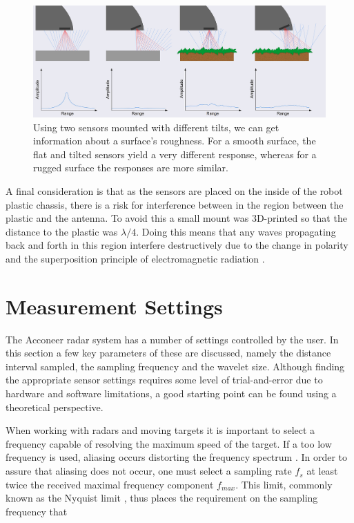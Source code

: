 \begin{figure}[h]
	\centering
	\includegraphics[scale=0.9]{figs_temp/reflections.jpg}
	\caption{Using two sensors mounted with different tilts, we can get information about a surface's roughness. For a smooth surface, the flat and tilted sensors yield a very different response, whereas for a rugged surface the responses are more similar.}
	\label{fig:reflections}
\end{figure}

A final consideration is that as the sensors are placed on the inside of the robot plastic chassis, there is a risk for interference between in the region between the plastic and the antenna. To avoid this a small mount was 3D-printed so that the distance to the plastic was $\lambda/4$. Doing this means that any waves propagating back and forth in this region interfere destructively due to the change in polarity and the superposition principle of electromagnetic radiation \citep{griffiths_2018}.

\section{Measurement Settings}

The Acconeer radar system has a number of settings controlled by the user. In this section a few key parameters of these are discussed, namely the distance interval sampled, the sampling frequency and the wavelet size. Although finding the appropriate sensor settings requires some level of trial-and-error due to hardware and software limitations, a good starting point can be found using a theoretical perspective. 


When working with radars and moving targets it is important to select a frequency capable of resolving the maximum speed of the target. If a too low frequency is used, aliasing occurs distorting the frequency spectrum \citep{lindgren_rootzeŽn_sandsten_2013}. In order to assure that aliasing does not occur, one must select a sampling rate $f_s$ at least twice the received maximal frequency component $f_{max}$. This limit, commonly known as the Nyquist limit \citep{proakis_manolakis_1995}, thus places the requirement on the sampling frequency that 

